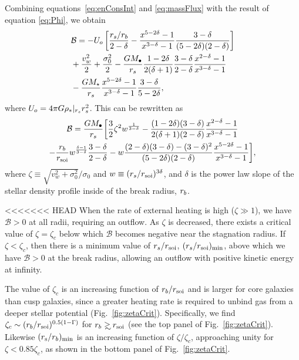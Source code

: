 Combining equations~\eqref{eq:enConsInt} and \eqref{eq:massFlux} with
the result of equation \eqref{eq:Phi}, we obtain
\begin{align}
  &\mathcal{B} = -U_o\left[\frac{r_s/r_b}{2-\delta}-\frac{x^{5-2\delta}-1}{x^{3-\delta}-1}\frac{3-\delta}{(5-2\delta)(2-\delta)}\right]\nonumber\\
  &+\frac{v_w^2}{2}+\frac{\sigma_0^2}{2}- \frac{G M_{\bullet}}{r_s}
  \frac{1-2\delta}{2(\delta+1)}
  \frac{3-\delta}{2-\delta}\frac{x^{2-\delta}-1}{x^{3-\delta}-1}
  \nonumber\\
  &-\frac{G M_\star}{r_s}
  \frac{x^{5-2\delta}-1}{x^{3-\delta}-1}\frac{3-\delta}{5-2\delta},
\end{align}
where $U_o=4 \pi G \rho_*|_{r_s} r_s^2$.  This can be rewritten as
\begin{multline}
  \mathcal{B} =\frac{G M_{\bullet}}{r_s} \biggl[ \frac{3}{2} \zeta^2
  w^{\frac{1}{3 -\delta}}
  -\frac{(1-2\delta)(3-\delta)}{2(\delta+1)(2-\delta)}  \frac{x^{2  -\delta}-1}{x^{3-\delta}-1}\\
  -\frac{r_b}{r_{\rm soi}} w^{\frac{\delta-1}{3-\delta}} \frac{3 -\delta}{2
    -\delta} -w
  \frac{(2-\delta)(3-\delta)-(3-\delta)^{2}}{(5-2\delta)(2-\delta)}
  \frac{x^{5-2\delta}-1}{x^{3-\delta}-1} \biggr],
\label{eq:enthAnal}
\end{multline}
where $\zeta \equiv \sqrt{v_w^2+\sigma_0^2}/\sigma_0$ and $w\equiv
(r_s/r_{\rm soi})^{3\delta}$, and $\delta$ is the power law slope of the
stellar density profile inside of the break radius, $r_b$.

<<<<<<< HEAD
When the rate of external heating is high ($\zeta \gg 1$), we have $\mathcal{B} > 0$ at all radii, requiring an outflow.  As $\zeta$ is decreased, there exists a critical value of $\zeta = \zeta_{c}$ below which $\mathcal{B}$ becomes negative near the stagnation radius.  If $\zeta<\zeta_c$, then there is a minimum value of $r_s/r_{\rm soi}$, $(r_s/r_{\rm soi})_{\rm min}$, above which we have $\mathcal{B} > 0$ at the break radius, allowing an outflow with positive kinetic energy at infinity.  

The value of $\zeta_c$ is an increasing function of $r_{b}/r_{\rm soi}$ and is larger for core galaxies than cusp galaxies, since a greater heating rate is required to unbind gas from a deeper stellar potential (Fig.~\ref{fig:zetaCrit}).  Specifically, we find $\zeta_c\sim (r_b/r_{\rm soi})^{0.5(1-\Gamma)}$ for $\rb\gsim\rsoi$ (see the top panel of
Fig.~\ref{fig:zetaCrit}). Likewise $(r_{\rm s}/r_{b})_{\rm min}$ is an increasing function of $\zeta/\zeta_{c}$, approaching unity for $\zeta < 0.85\zeta_c$, as shown in the
bottom panel of Fig.~\ref{fig:zetaCrit}.


